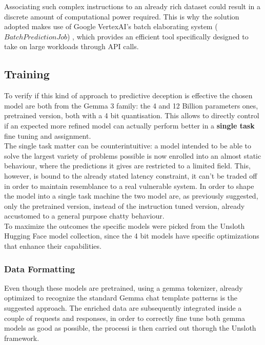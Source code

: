 \documentclass[10pt,a4paper,twocolumn]{article}
\begin{document}
Associating such complex instructions to an already rich dataset could result in a discrete amount of computational power required. This is why the solution adopted makes use of Google VertexAI's batch elaborating system ($BatchPredictionJob$) \cite{google_vertex_ai_prediction_classes}, which provides an efficient tool specifically designed to take on large workloads through API calls. 

\subsection{Training}
To verify if this kind of approach to predictive deception is effective the chosen model are both from the Gemma 3 family: the 4 and 12 Billion parameters ones, pretrained version, both with a 4 bit quantisation. This allows to directly control if an expected more refined model can actually perform better in a \textbf{single task} fine tuning and assignment.\\
The single task matter can be counterintuitive: a model intended to be able to solve the largest variety of problems possible is now enrolled into an almost static behaviour, where the predictions it gives are restricted to a limited field. This, however, is bound to the already stated latency constraint, it can't be traded off in order to maintain resemblance to a real vulnerable system. In order to shape the model into a single task machine the two model are, as previously suggested, only the pretrained version, instead of the instruction tuned version, already accustomed to a general purpose chatty behaviour.\\
To maximize the outcomes the specific models were picked from the Unsloth Hugging Face model collection, since the 4 bit models have specific optimizations that enhance their capabilities. \cite{gemma_2025_report} \cite{gemma3_train_blog} \cite{unsloth_gemma3_4b_pt_unsloth_bnb_4bit}
\cite{unsloth_gemma3_12b_pt_unsloth_bnb_4bit}\\

\subsubsection{Data Formatting}
Even though these models are pretrained, using a gemma  tokenizer, already optimized to recognize the standard Gemma chat template patterns is the suggested approach. \cite{gemma_chat_template} 
The enriched data are subsequently integrated inside a couple of requests and responses, in order to correctly fine tune both gemma models as good as possible, the processi is then carried out thorugh the Unsloth framework.
\end{document}
